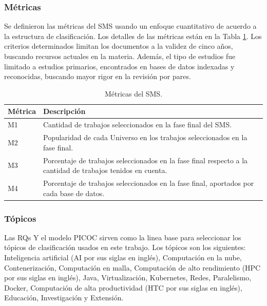 \subsubsection{Métricas}
Se definieron las métricas del SMS usando un enfoque cuantitativo de acuerdo a la estructura de clasificación. Los detalles de las métricas están en la Tabla \ref{table:Metrics}. Los criterios determinados limitan los documentos a la validez de cinco años, buscando recursos actuales en la materia. Además, el tipo de estudios fue limitado a estudios primarios, encontrados en bases de datos indexadas y reconocidas, buscando mayor rigor en la revisión por pares.

\begin{table}[htbp]

	\centering
	\renewcommand{\arraystretch}{1.7}  %
	\setlength{\tabcolsep}{3pt}      %
	\vspace{10pt}                     %
	\begin{tabular}{|>{\arraybackslash}m{1cm}|>{\arraybackslash}m{7cm}|}
		\hline
		\textbf{Métrica} & \textbf{Descripción}                                                                                        \\
		\hline
		M1               & Cantidad de trabajos seleccionados en la fase final del SMS.                                                \\
		\hline
		M2               & Popularidad de cada Universo en los trabajos seleccionados en la fase final.                                \\
		\hline
		M3               & Porcentaje de trabajos seleccionados en la fase final respecto a la cantidad de trabajos tenidos en cuenta. \\
		\hline
		M4               & Porcentaje de trabajos seleccionados en la fase final, aportados por cada base de datos.                    \\
		\hline
	\end{tabular}
	\vspace{6pt}  %
	\caption{Métricas del SMS.}
	\label{table:Metrics}

\end{table}

\subsubsection{Tópicos}
Las RQs Y el modelo PICOC sirven como la linea base para seleccionar los tópicos de clasificación usados en este trabajo. Los tópicos son los siguientes: Inteligencia artificial (AI por sus siglas en inglés), Computación en la nube, Contenerización, Computación en malla, Computación de alto rendimiento (HPC por sus siglas en inglés), Java, Virtualización, Kubernetes, Redes, Paralelismo, Docker, Computación de alta productividad (HTC por sus siglas en inglés), Educación, Investigación y Extensión. %

